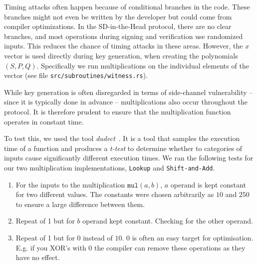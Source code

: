 \documentclass[11pt]{report}
\theoremstyle{definition}
\theoremstyle{plain}
\begin{document}
Timing attacks often happen because of conditional branches in the code. These branches might not even be written by the developer but could come from compiler optimizations. In the SD-in-the-Head protocol, there are no clear branches, and most operations during signing and verification use randomized inputs. This reduces the chance of timing attacks in these areas. However, the $x$ vector is used directly during key generation, when creating the polynomials $(S, P, Q)$. Specifically we run multiplications on the individual elements of the vector (see file \texttt{src/subroutines/witness.rs}).

While key generation is often disregarded in terms of side-channel vulnerability -- since it is typically done in advance -- multiplications also occur throughout the protocol. It is therefore prudent to ensure that the multiplication function operates in constant time.

To test this, we used the tool \textit{dudect}~\cite{reparaz2017dude}. It is a tool that samples the execution time of a function and produces a \textit{t-test} to determine whether to categories of inputs cause significantly different execution times. We ran the following tests for our two multiplication implementations, \texttt{Lookup} and \texttt{Shift-and-Add}.

\begin{enumerate}
  \item For the inputs to the multiplication $\texttt{mul}(a,b)$, $a$ operand is kept constant for two different values. The constants were chosen arbitrarily as $10$ and $250$ to ensure a large difference between them.\label{dudect_test_1}
  \item Repeat of 1 but for $b$ operand kept constant. Checking for the other operand.\label{dudect_test_2}
  \item Repeat of 1 but for $0$ instead of $10$. $0$ is often an easy target for optimisation. E.g. if you XOR's with $0$ the compiler can remove these operations as they have no effect.\label{dudect_test_3}
\end{enumerate}
\end{document}
